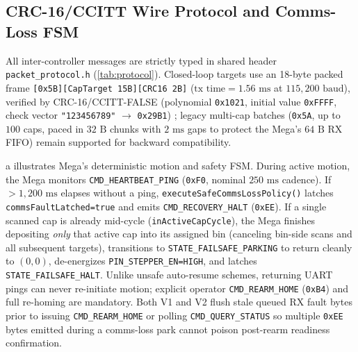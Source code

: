 \documentclass[10pt,twocolumn,letterpaper]{article}
\begin{document}
\subsection{CRC-16/CCITT Wire Protocol and Comms-Loss FSM}
All inter-controller messages are strictly typed in shared header \texttt{packet\_protocol.h} (\cref{tab:protocol}). Closed-loop targets use an 18-byte packed frame \texttt{[0x5B][CapTarget 15B][CRC16 2B]} ($\text{tx time} = 1.56\text{ ms}$ at $115{,}200\text{ baud}$), verified by CRC-16/CCITT-FALSE (polynomial \texttt{0x1021}, initial value \texttt{0xFFFF}, check vector \texttt{"123456789"} $\to$ \texttt{0x29B1}) \cite{koopman2004cyclic}; legacy multi-cap batches (\texttt{0x5A}, up to $100$ caps, paced in $32\text{ B}$ chunks with $2\text{ ms}$ gaps to protect the Mega's $64\text{ B}$ RX FIFO) remain supported for backward compatibility.

a illustrates Mega's deterministic motion and safety FSM. During active motion, the Mega monitors \texttt{CMD\_HEARTBEAT\_PING} (\texttt{0xF0}, nominal $250\text{ ms}$ cadence). If $>1{,}200\text{ ms}$ elapses without a ping, \texttt{executeSafeCommsLossPolicy()} latches \texttt{commsFaultLatched=true} and emits \texttt{CMD\_RECOVERY\_HALT} (\texttt{0xEE}). If a single scanned cap is already mid-cycle (\texttt{inActiveCapCycle}), the Mega finishes depositing \emph{only} that active cap into its assigned bin (canceling bin-side scans and all subsequent targets), transitions to \texttt{STATE\_FAILSAFE\_PARKING} to return cleanly to $(0,0)$, de-energizes \texttt{PIN\_STEPPER\_EN=HIGH}, and latches \texttt{STATE\_FAILSAFE\_HALT}. Unlike unsafe auto-resume schemes, returning UART pings can never re-initiate motion; explicit operator \texttt{CMD\_REARM\_HOME} (\texttt{0xB4}) and full re-homing are mandatory. Both V1 and V2 flush stale queued RX fault bytes prior to issuing \texttt{CMD\_REARM\_HOME} or polling \texttt{CMD\_QUERY\_STATUS} so multiple \texttt{0xEE} bytes emitted during a comms-loss park cannot poison post-rearm readiness confirmation.
\end{document}
